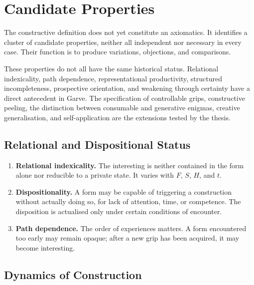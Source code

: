 \documentclass[11pt,a4paper]{article}
\begin{document}
\section{Candidate Properties}

The constructive definition does not yet constitute an axiomatics. It identifies
a cluster of candidate properties, neither all independent nor necessary in
every case. Their function is to produce variations, objections, and
comparisons.

These properties do not all have the same historical status. Relational
indexicality, path dependence, representational productivity, structured
incompleteness, prospective orientation, and weakening through certainty have a
direct antecedent in Garve. The specification of controllable grips,
constructive peeling, the distinction between consumable and generative
enigmas, creative generalisation, and self-application are the extensions tested
by the thesis.

\subsection{Relational and Dispositional Status}

\begin{enumerate}
  \item \textbf{Relational indexicality.} The interesting is neither contained
        in the form alone nor reducible to a private state. It varies with
        \(F\), \(S\), \(H\), and \(t\).
  \item \textbf{Dispositionality.} A form may be capable of triggering a
        construction without actually doing so, for lack of attention, time, or
        competence. The disposition is actualised only under certain conditions
        of encounter.
  \item \textbf{Path dependence.} The order of experiences matters. A form
        encountered too early may remain opaque; after a new grip has been
        acquired, it may become interesting.
\end{enumerate}

\subsection{Dynamics of Construction}
\end{document}
